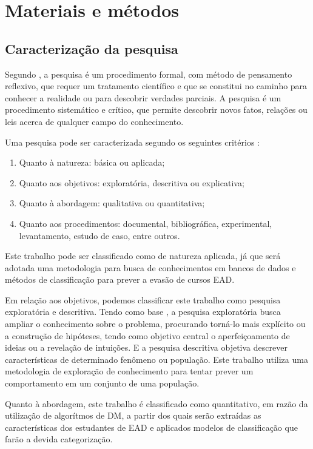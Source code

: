 \chapter{Materiais e métodos}

\section{Caracterização da pesquisa}

Segundo , a pesquisa é um procedimento
formal, com método de pensamento reflexivo, que requer um tratamento científico
e que se constitui no caminho para conhecer a realidade ou para descobrir
verdades parciais. A pesquisa é um procedimento sistemático e crítico,  que
permite descobrir novos fatos, relações ou leis acerca de qualquer campo do
conhecimento.

Uma pesquisa pode ser caracterizada segundo os seguintes critérios
\cite{gil2008metodos}:
\begin{enumerate}[label=\alph*)]
  \item Quanto à natureza: básica ou aplicada;
  \item Quanto aos objetivos: exploratória, descritiva ou explicativa;
  \item Quanto à abordagem: qualitativa ou quantitativa;
  \item Quanto aos procedimentos: documental, bibliográfica, experimental,
  levantamento, estudo de caso, entre outros.
\end{enumerate}

Este trabalho pode ser classificado como de natureza aplicada, já que será
adotada uma metodologia para busca de conhecimentos em bancos de dados e métodos
de classificação para prever a evasão de cursos EAD.

Em relação aos objetivos, podemos classificar este trabalho como pesquisa
exploratória e descritiva. Tendo como base , a
pesquisa exploratória busca ampliar o conhecimento sobre o problema, procurando
torná-lo mais explícito ou a construção de hipóteses, tendo como objetivo
central o aperfeiçoamento de ideias ou a revelação de intuições. E a pesquisa
descritiva objetiva descrever características de determinado fenômeno ou
população. Este trabalho utiliza uma metodologia de exploração de conhecimento
para tentar prever um comportamento em um conjunto de uma população.

Quanto à abordagem, este trabalho é classificado como quantitativo, em razão da
utilização de algorítmos de DM, a partir dos quais serão extraídas as
características dos estudantes de EAD e aplicados modelos de classificação que
farão a devida categorização.

